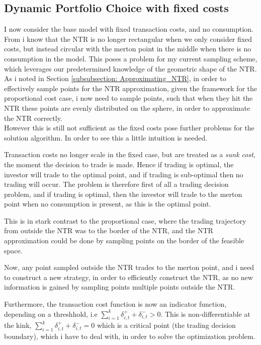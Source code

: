\documentclass[11pt]{article}
\begin{document}
\subsection{Dynamic Portfolio Choice with fixed costs} \label{Subsection: Results_WithConsumption}
I now consider the base model with fixed transaction costs, and no consumption.
From \autocite{Dybvig2020} i know that the \ac{NTR} is no longer rectangular when we only consider fixed costs, but instead circular with the merton point in the middle when there is no consumption in the model.
This poses a problem for my current sampling scheme, which leverages our predetermined knowledge of the geometric shape of the \ac{NTR}.
As i noted in Section \ref{subsubsection: Approximating_NTR}, in order to effectively sample points for the \ac{NTR} approximation, given the framework for the proportional cost case,
 i now need to sample points, such that when they hit the \ac{NTR} these points are evenly distributed on the sphere, in order to approximate the \ac{NTR} correctly.\\
However this is still not sufficient as the fixed costs pose further problems for the solution algorithm. In order to see this a little intuition is needed.

Transaction costs no longer scale in the fixed case, but are treated as a \textit{sunk cost}, the moment the decision to trade is made. Hence if trading is optimal, the investor will trade to the optimal point,
and if trading is sub-optimal then no trading will occur. The problem is therefore first of all a trading decision problem, and if trading is optimal, then the investor will trade to the merton point when no consumption is present, as this is the optimal point.

This is in stark contrast to the proportional case, where the trading trajectory from outside the \ac{NTR} was to the border of the \ac{NTR}, and the \ac{NTR} approximation could be done by sampling points on the border of the feasible space.

Now, any point sampled outside the \ac{NTR} trades to the merton point, and i need to construct a new strategy, 
in order to efficiently construct the \ac{NTR}, as no new information is
gained by sampling points multiple points outside the \ac{NTR}.

Furthermore, the transaction cost function is now an indicator function, depending on a threshhold, i.e $\sum^{k}_{i=1} \delta^{+}_{i,t} + \delta^{-}_{i,t}  > 0$.
This is non-differentiable at the kink, $\sum^{k}_{i=1} \delta^{+}_{i,t} + \delta^{-}_{i,t} =0$ 
which is a critical point (the trading decision boundary), which i have to deal with, in order to solve the optimization problem.
\end{document}
